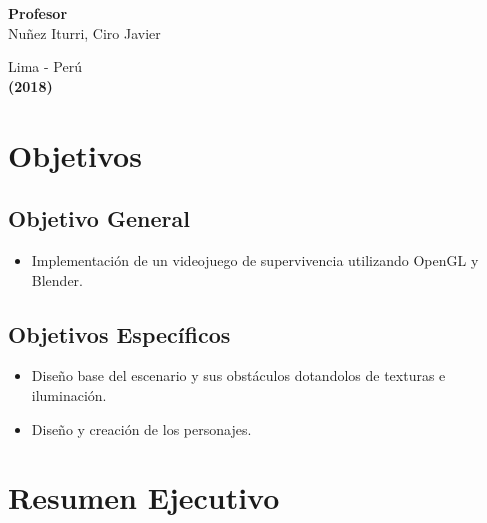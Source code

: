 \documentclass[a4paper]{article}
\begin{document}
\begin{titlepage}
\begin{center}
\begin{large}
\end{large}

\vspace*{0.4in}
\begin{large}
{\bf Profesor} 
\vspace*{0.1in}
\\Nuñez Iturri, Ciro Javier
\end{large}

\end{center}
\begin{center}
\begin{large}
\vspace*{1.0in}
Lima - Perú\\
{\bf (2018)}
\end{large}
\end{center}
\end{titlepage}

\pagebreak
\tableofcontents
\pagebreak


\section{Objetivos}
\subsection{Objetivo General}
\begin{itemize}

\item Implementación de un videojuego de supervivencia utilizando OpenGL y Blender.
\end{itemize}

\subsection{Objetivos Específicos}
\begin{itemize}
\item Diseño base del escenario y sus obstáculos dotandolos de texturas e iluminación.
\item Diseño y creación de los personajes.
\end{itemize}



\pagebreak
\section{Resumen Ejecutivo}
\end{document}
